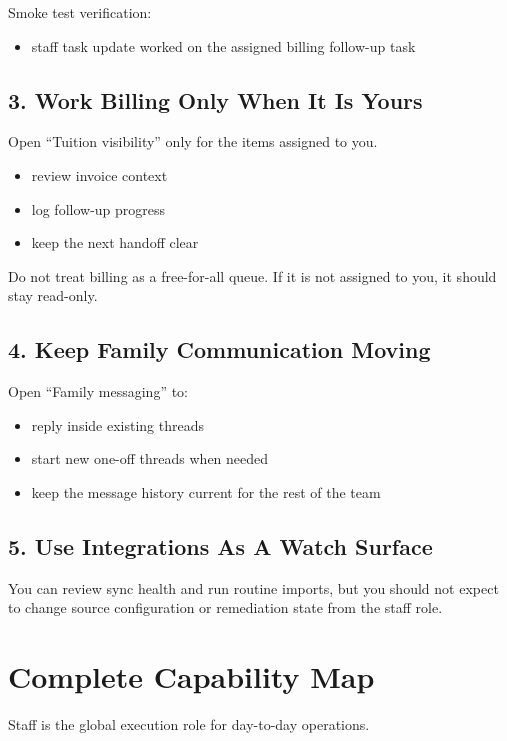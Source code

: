 \documentclass[11pt]{article}
\begin{document}
Smoke test verification:
\begin{itemize}
  \item staff task update worked on the assigned billing follow-up task
\end{itemize}

\subsection*{3. Work Billing Only When It Is Yours}
Open ``Tuition visibility'' only for the items assigned to you.
\begin{itemize}
  \item review invoice context
  \item log follow-up progress
  \item keep the next handoff clear
\end{itemize}

Do not treat billing as a free-for-all queue. If it is not assigned to you, it should stay read-only.

\subsection*{4. Keep Family Communication Moving}
Open ``Family messaging'' to:
\begin{itemize}
  \item reply inside existing threads
  \item start new one-off threads when needed
  \item keep the message history current for the rest of the team
\end{itemize}

\subsection*{5. Use Integrations As A Watch Surface}
You can review sync health and run routine imports, but you should not expect to change source configuration or remediation state from the staff role.

\section*{Complete Capability Map}
Staff is the global execution role for day-to-day operations.
\end{document}

